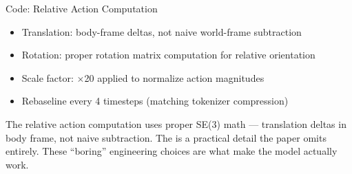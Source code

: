 \begin{frame}{Code: Relative Action Computation}
\begin{methodbox}
\begin{itemize}
    \item Translation: body-frame deltas,
          not naive world-frame subtraction
    \item Rotation: proper rotation matrix computation
          for relative orientation
    \item Scale factor: $\times$20 applied
          to normalize action magnitudes
    \item Rebaseline every 4 timesteps
          (matching tokenizer compression)
\end{itemize}
\end{methodbox}

\vspace{0.5em}
\begin{softbox}
 The relative action computation uses
proper SE(3) math --- translation deltas in body frame,
not naive subtraction. The 
is a practical detail the paper omits entirely.
These ``boring'' engineering choices are
what make the model actually work.
\end{softbox}
\end{frame}


\begin{frame}[plain]
\begin{center}
\vfill
{\Huge{}}\\[1em]
{\large{}}
\vfill
\end{center}
\end{frame}

